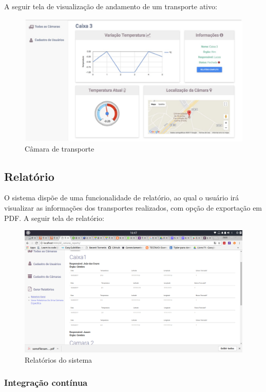 	A seguir tela de visualização de andamento de um transporte ativo:

\begin{figure}[H]
\centering
\includegraphics[width=16cm]{figuras/camara_software.jpg}
\caption{Câmara de transporte}
\end{figure}

\subsection{Relatório}
	O sistema dispõe de uma funcionalidade de relatório, ao qual o usuário irá visualizar as informações dos transportes realizados, com opção de exportação em PDF.
	A seguir tela de relatório:
\begin{figure}[H]
\centering
\includegraphics[width=16cm]{figuras/relatorio_software.png}
\caption{Relatórios do sistema}
\end{figure}

\subsubsection{Integração contínua}

